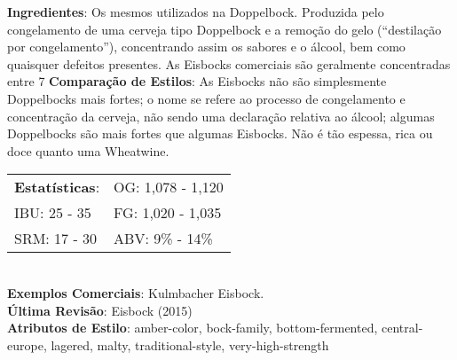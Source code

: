 \textbf{Ingredientes}: Os mesmos utilizados na Doppelbock. Produzida pelo congelamento de uma cerveja tipo Doppelbock e a remoção do gelo (“destilação por congelamento”), concentrando assim os sabores e o álcool, bem como quaisquer defeitos presentes. As Eisbocks comerciais são geralmente concentradas entre 7%
\textbf{Comparação de Estilos}: As Eisbocks não são simplesmente Doppelbocks mais fortes; o nome se refere ao processo de congelamento e concentração da cerveja, não sendo uma declaração relativa ao álcool; algumas Doppelbocks são mais fortes que algumas Eisbocks. Não é tão espessa, rica ou doce quanto uma Wheatwine. \\
\begin{tabular}{@{}p{35mm}p{35mm}@{}}
  \textbf{Estatísticas}: & OG: 1,078 - 1,120 \\
  IBU: 25 - 35 & FG: 1,020 - 1,035 \\
  SRM: 17 - 30 & ABV: 9\% - 14\%
\end{tabular}\\
\textbf{Exemplos Comerciais}: Kulmbacher Eisbock. \\
\textbf{Última Revisão}: Eisbock (2015) \\
\textbf{Atributos de Estilo}: amber-color, bock-family, bottom-fermented, central-europe, lagered, malty, traditional-style, very-high-strength
